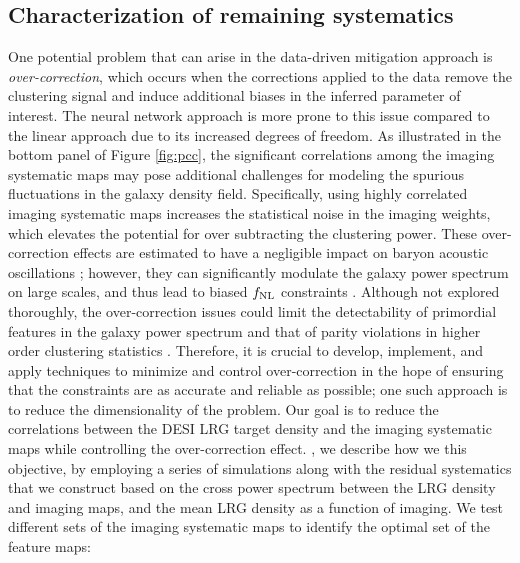 \subsection{Characterization of remaining systematics}\label{sec:systests}
 One potential problem that can arise in the data-driven mitigation approach is \textit{over-correction}, which occurs when the corrections applied to the data remove the clustering signal and induce additional biases in the inferred parameter of interest. The neural network approach is more prone to this issue compared to the linear approach due to its increased degrees of freedom. As illustrated in the bottom panel of Figure \ref{fig:pcc}, the significant correlations among the imaging systematic maps may pose additional challenges for modeling the spurious fluctuations in the galaxy density field. Specifically, using highly correlated imaging systematic maps increases the statistical noise in the imaging weights, which elevates the potential for over subtracting the clustering power. These over-correction effects are estimated to have a negligible impact on baryon acoustic oscillations \citep{merz2021clustering}; however, they can significantly modulate the galaxy power spectrum on large scales, and thus lead to biased $f_{\rm NL}$ constraints \citep{rezaie2021primordial, mueller2022primordial}. Although not explored thoroughly, the over-correction issues could limit the detectability of primordial features in the galaxy power spectrum and that of parity violations in higher order clustering statistics \citep{beutler2019primordial, cahn2021test, philcox2022probing}. Therefore, it is crucial to develop, implement, and apply techniques to minimize and control over-correction in the hope of ensuring that the constraints are as accurate and reliable as possible; one such approach is to reduce the dimensionality of the problem. Our goal is to reduce the correlations between the DESI LRG target density and the imaging systematic maps while controlling the over-correction effect. , we describe how we  this objective, by employing a series of simulations along with the residual systematics that we construct based on the cross power spectrum between the LRG density and imaging maps, and the mean LRG density as a function of imaging. We test different sets of the imaging systematic maps to identify the optimal set of the feature maps:
